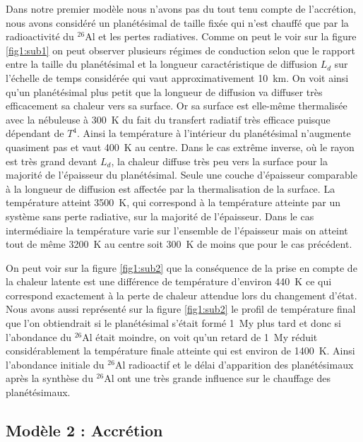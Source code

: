 \documentclass[10pt,a4paper]{article}
\numberwithin{equation}{section}
\begin{document}
Dans notre premier modèle nous n'avons pas du tout tenu compte de l'accrétion, nous avons considéré un planétésimal de taille fixée qui n'est chauffé que par la radioactivité du $^{26}$Al et les pertes radiatives. Comme on peut le voir sur la figure \ref{fig1:sub1} on peut observer plusieurs régimes de conduction selon que le rapport entre la taille du planétésimal et la longueur caractéristique de diffusion $L_d$ sur l'échelle de temps considérée qui vaut approximativement \SI{10}{km}. On voit ainsi qu'un planétésimal plus petit que la longueur de diffusion va diffuser très efficacement sa chaleur vers sa surface. Or sa surface est elle-même thermalisée avec la nébuleuse à \SI{300}{K} du fait du transfert radiatif très efficace puisque dépendant de $T^4$. Ainsi la température à l'intérieur du planétésimal n’augmente quasiment pas et vaut \SI{400}{K} au centre. Dans le cas extrême inverse, où le rayon est très grand devant $L_d$, la chaleur diffuse très peu vers la surface pour la majorité de l'épaisseur du planétésimal. Seule une couche d'épaisseur comparable à la longueur de diffusion est affectée par la thermalisation de la surface. La température atteint \SI{3500}{K}, qui correspond à la température atteinte par un système sans perte radiative, sur la majorité de l'épaisseur. Dans le cas intermédiaire la température varie sur l'ensemble de l'épaisseur mais on atteint tout de même \SI{3200}{K} au centre soit \SI{300}{K} de moins que pour le cas précédent.

On peut voir sur la figure \ref{fig1:sub2} que la conséquence  de la prise en compte de la chaleur latente est une différence de température d'environ \SI{440}{K} ce qui correspond exactement à la perte de chaleur attendue lors du changement d'état. Nous avons aussi représenté sur la figure \ref{fig1:sub2} le profil de température final que l'on obtiendrait si le planétésimal s'était formé \SI{1}{My} plus tard et donc si l'abondance du $^{26}$Al était moindre, on voit qu'un retard de \SI{1}{My} réduit considérablement la température finale atteinte qui est environ de \SI{1400}{K}. Ainsi l'abondance initiale du $^{26}$Al radioactif et le délai d'apparition des planétésimaux après la synthèse du $^{26}$Al ont une très grande influence sur le chauffage des planétésimaux.





\subsection{Modèle 2 : Accrétion}
\end{document}
